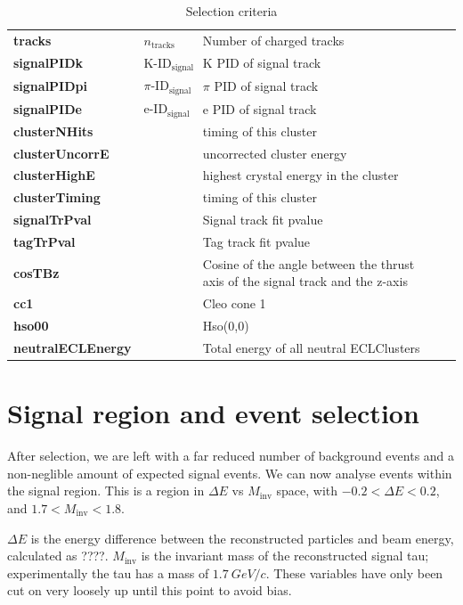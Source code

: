 \documentclass[12pt]{thesis}  %
\begin{document}
\begin{table}[h]
\begin{tabular}{lllll}
\textbf{tracks} & $n_{\text{tracks}}$ & Number of charged tracks &  &  \\
\textbf{signalPIDk} & $\text{K-ID}_{\text{signal}}$ & K PID of signal track &  &  \\
\textbf{signalPIDpi} & $\pi\text{-ID}_{\text{signal}}$ & $\pi$ PID of signal track &  &  \\
\textbf{signalPIDe} & $\text{e-ID}_{\text{signal}}$ & e PID of signal track &  &  \\
\textbf{clusterNHits} &  & timing of this cluster &  &  \\
\textbf{clusterUncorrE} &  & uncorrected cluster energy &  &  \\
\textbf{clusterHighE} &  & highest crystal energy in the cluster &  &  \\
\textbf{clusterTiming} &  & timing of this cluster &  &  \\
\textbf{signalTrPval} &  & Signal track fit pvalue &  &  \\
\textbf{tagTrPval} &  & Tag track fit pvalue &  &  \\
\textbf{cosTBz} &  & Cosine of the angle between the thrust axis of the signal track and the z-axis &  &  \\
\textbf{cc1} &  & Cleo cone 1 &  &  \\
\textbf{hso00} &  & Hso(0,0) &  &  \\
\textbf{neutralECLEnergy} &  & Total energy of all neutral ECLClusters &  & 
\end{tabular}
\caption{Selection criteria}
\label{my-label}
\end{table}


\pagebreak


\chapter{Signal region and event selection}

After selection, we are left with a far reduced number of background events and a non-neglible amount of expected signal events. We can now analyse events within the signal region. This is a region in $\Delta E$ vs $M_{\text{inv}}$ space, with $-0.2 < \Delta E < 0.2$, and $1.7 < M_{\text{inv}} < 1.8$.

$\Delta E$ is the energy difference between the reconstructed particles and beam energy, calculated as ????. $M_{\text{inv}}$ is the invariant mass of the reconstructed signal tau; experimentally the tau has a mass of $\SI{1.7}{GeV/c}$. These variables have only been cut on very loosely up until this point to avoid bias.
\end{document}
